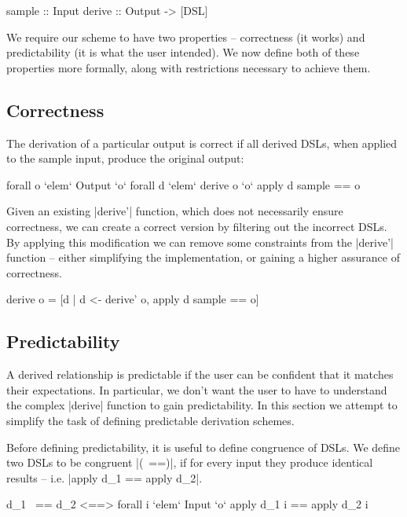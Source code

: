 \documentclass[preprint,draft]{sigplanconf}
\begin{document}
\begin{code}
sample  :: Input
derive  :: Output -> [DSL]
\end{code}

We require our scheme to have two properties -- correctness (it works) and predictability (it is what the user intended). We now define both of these properties more formally, along with restrictions necessary to achieve them.

\subsection{Correctness}
\label{sec:correctness}

The derivation of a particular output is correct if all derived DSLs, when applied to the sample input, produce the original output:

\ignore\begin{code}
forall o `elem` Output `o` forall d `elem` derive o `o` apply d sample == o
\end{code}

Given an existing |derive'| function, which does not necessarily ensure correctness, we can create a correct version by filtering out the incorrect DSLs. By applying this modification we can remove some constraints from the |derive'| function -- either simplifying the implementation, or gaining a higher assurance of correctness.

\begin{code}
derive o = [d | d <- derive' o, apply d sample == o]
\end{code}

\subsection{Predictability}

A derived relationship is predictable if the user can be confident that it matches their expectations. In particular, we don't want the user to have to understand the complex |derive| function to gain predictability. In this section we attempt to simplify the task of defining predictable derivation schemes.

Before defining predictability, it is useful to define congruence of DSLs. We define two DSLs to be congruent |(~==)|, if for every input they produce identical results -- i.e. |apply d_1 == apply d_2|.

\ignore\begin{code}
d_1 ~== d_2 <==> forall i `elem` Input `o` apply d_1 i == apply d_2 i
\end{code}
\end{document}
